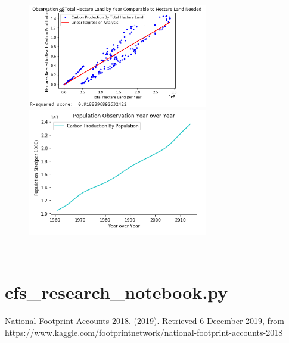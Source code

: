 \documentclass[journal,onecolumn]{IEEEtran}
\begin{document}
     \begin{figure}[h]
	\centering
  	\includegraphics[width=0.7\textwidth]{img/Australia-Carbon.png}
  	  	\includegraphics[width=0.7\textwidth]{img/Australia-Population.png}
\end{figure}\\

\newpage

\section{cfs\_research\_notebook.py}
\label{app1}
\lstset{basicstyle=\small\selectfont\ttfamily}


\newpage


\begin{thebibliography}{1}


National Footprint Accounts 2018. (2019). Retrieved 6 December 2019, from https://www.kaggle.com/footprintnetwork/national-footprint-accounts-2018

\end{thebibliography}

\end{document}
